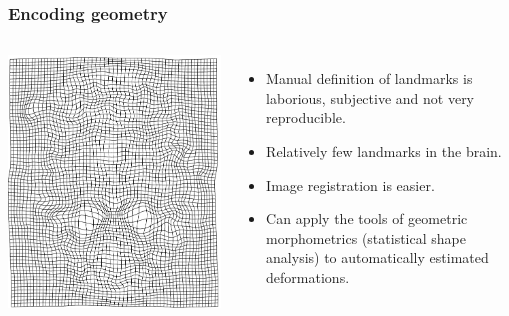 \begin{frame}
\frametitle{Encoding geometry}
\begin{columns}[c]
\includegraphics[width=\textwidth]{def}
\begin{itemize}
\item Manual definition of landmarks is laborious, subjective and not very reproducible.
\item Relatively few landmarks in the brain.
\item Image registration is easier.
\item Can apply the tools of geometric morphometrics (statistical shape analysis) to automatically estimated deformations.
\end{itemize}
\end{columns}
\end{frame}


